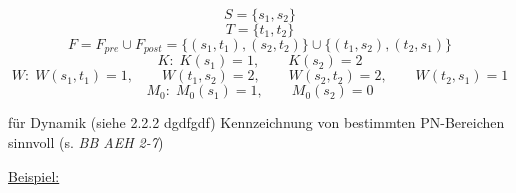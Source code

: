 \documentclass[12pt,a4paper]{scrartcl}
\numberwithin{equation}{section}
\begin{document}
\begin{equation}
	S = \{ s_1, s_2 \}
\end{equation}
\begin{equation}
	T = \{ t_1, t_2 \}
\end{equation}
\begin{equation}
	F = F_{pre} \cup F_{post} = \{ (s_1, t_1), (s_2,t_2) \} \cup \{(t_1, s_2), (t_2, s_1) \}
\end{equation}
\begin{equation}
	K:\; K(s_1)=1, \qquad K(s_2)=2
\end{equation}
\begin{equation}
	W:\; W(s_1,t_1)=1, \qquad W(t_1,s_2)=2, \qquad W(s_2,t_2)=2, \qquad W(t_2,s_1)=1
\end{equation}
\begin{equation}
	M_0:\; M_0(s_1)=1, \qquad M_0(s_2)=0
\end{equation}

für Dynamik (siehe 2.2.2 dgdfgdf) Kennzeichnung von bestimmten PN-Bereichen sinnvoll (s. \textit{BB AEH 2-7})

\underline{Beispiel: }
\end{document}
